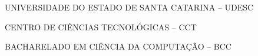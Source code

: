 

\renewcommand{\imprimircapa}{%
    \begin{capa}%
        \center

        {\fontseries{b}\selectfont\MakeTextUppercase{UNIVERSIDADE DO ESTADO DE SANTA CATARINA -- UDESC}}

        {\fontseries{b}\selectfont\MakeTextUppercase{CENTRO DE CIÊNCIAS TECNOLÓGICAS -- CCT  }}

        {\fontseries{b}\selectfont\MakeTextUppercase{BACHARELADO EM CIÊNCIA DA COMPUTAÇÃO -- BCC  }}

        \vfill

        {\fontseries{b}\selectfont\MakeTextUppercase{\normalsize\imprimirautor}}

        \vfill
        \begin{center}
            {\fontseries{b}\selectfont\MakeTextUppercase{\imprimirtitulo}}
        \end{center}
        \vfill

        \vfill

        {\fontseries{b}\selectfont\MakeTextUppercase{\imprimirlocal}}
        \par
        {\fontseries{b}\selectfont \imprimirdata}
        \vspace*{1cm}
    \end{capa}
}

\imprimircapa